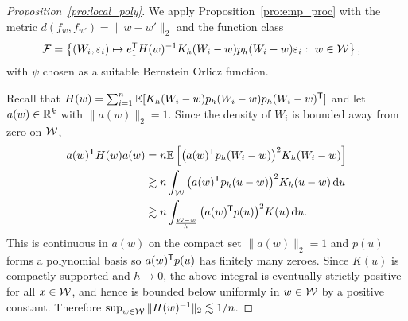 \begin{proof}[Proposition~\ref{pro:local_poly}]

  We apply Proposition~\ref{pro:emp_proc}
  with the metric $d(f_w, f_{w'}) = \|w-w'\|_2$
  and the function class
  \begin{align*}
    \mathcal{F}
    &=
    \left\{
      (W_i, \varepsilon_i) \mapsto
      e_1^{\mathsf{T}} H(w)^{-1} K_h(W_i-w) p_h(W_i-w)
      \varepsilon_i
      :\ w \in \mathcal{W}
    \right\},
  \end{align*}
  with $\psi$ chosen as a suitable Bernstein Orlicz function.


  Recall that
  $H(w) = \sum_{i=1}^n \mathbb{E}[K_h(W_i-w) p_h(W_i-w)p_h(W_i-w)^{\mathsf{T}}]$
  and let $a(w) \in \mathbb{R}^k$ with $\|a(w)\|_2 = 1$.
  Since the density of $W_i$ is bounded away from zero on $\mathcal{W}$,
  \begin{align*}
    a(w)^{\mathsf{T}} H(w) a(w)
    &=
    n \mathbb{E}\left[
      \big( a(w)^{\mathsf{T}} p_h(W_i-w) \big)^2
      K_h(W_i-w)
    \right] \\
    &\gtrsim
    n \int_{\mathcal{W}}
    \big( a(w)^{\mathsf{T}} p_h(u-w) \big)^2
    K_h(u-w)
    \,\mathrm{d}u \\
    &\gtrsim
    n \int_{\frac{\mathcal{W}-w}{h}}
    \big( a(w)^{\mathsf{T}} p(u) \big)^2
    K(u)
    \,\mathrm{d}u.
  \end{align*}
  This is continuous in $a(w)$ on the compact set
  $\|a(w)\|_2 = 1$
  and $p(u)$ forms a polynomial basis so
  $a(w)^{\mathsf{T}} p(u)$ has finitely many zeroes.
  Since $K(u)$ is compactly supported
  and $h \to 0$,
  the above integral is eventually strictly positive
  for all $x \in \mathcal{W}$,
  and hence is bounded below uniformly in $w \in \mathcal{W}$
  by a positive constant.
  Therefore
  $\sup_{w \in \mathcal{W}} \|H(w)^{-1}\|_2 \lesssim 1/n$.



\end{proof}

